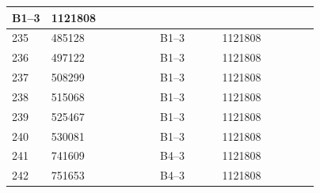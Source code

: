 \documentclass[UTF8,10pt,a4paper,fontset=fandol]{ctexart}
\newcommand{\fieldvalue}[1]{#1}
\begin{document}
\begin{center}
\begin{tabular}{|p{0.08\linewidth}|p{0.28\linewidth}|p{0.16\linewidth}|p{0.25\linewidth}|}
\fieldvalue{B1--3} &
\fieldvalue{1121808} & \\ \hline
235 &
\fieldvalue{485128} &
\fieldvalue{B1--3} &
\fieldvalue{1121808} & \\ \hline
236 &
\fieldvalue{497122} &
\fieldvalue{B1--3} &
\fieldvalue{1121808} & \\ \hline
237 &
\fieldvalue{508299} &
\fieldvalue{B1--3} &
\fieldvalue{1121808} & \\ \hline
238 &
\fieldvalue{515068} &
\fieldvalue{B1--3} &
\fieldvalue{1121808} & \\ \hline
239 &
\fieldvalue{525467} &
\fieldvalue{B1--3} &
\fieldvalue{1121808} & \\ \hline
240 &
\fieldvalue{530081} &
\fieldvalue{B1--3} &
\fieldvalue{1121808} & \\ \hline
241 &
\fieldvalue{741609} &
\fieldvalue{B4--3} &
\fieldvalue{1121808} & \\ \hline
242 &
\fieldvalue{751653} &
\fieldvalue{B4--3} &
\fieldvalue{1121808} & \\ \hline

\end{tabular}
\end{center}
\end{document}
